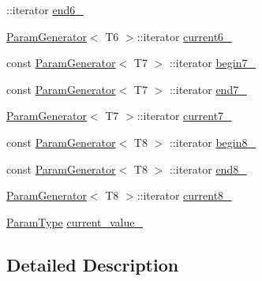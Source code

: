 \begin{DoxyCompactItemize}
\-::iterator \hyperlink{classtesting_1_1internal_1_1CartesianProductGenerator8_1_1Iterator_aa7a82d43bb33f76b3ae3a87435d3e97e}{end6\-\_\-}
\item 
\hyperlink{classtesting_1_1internal_1_1ParamGenerator}{\-Param\-Generator}$<$ \-T6 $>$\-::iterator \hyperlink{classtesting_1_1internal_1_1CartesianProductGenerator8_1_1Iterator_ab8337df5dbe6ea9aeac0a56c7ef816f9}{current6\-\_\-}
\item 
const \hyperlink{classtesting_1_1internal_1_1ParamGenerator}{\-Param\-Generator}$<$ \-T7 $>$\*
\-::iterator \hyperlink{classtesting_1_1internal_1_1CartesianProductGenerator8_1_1Iterator_a7b6566d85fbeda1c87fa7c5fe6d92214}{begin7\-\_\-}
\item 
const \hyperlink{classtesting_1_1internal_1_1ParamGenerator}{\-Param\-Generator}$<$ \-T7 $>$\*
\-::iterator \hyperlink{classtesting_1_1internal_1_1CartesianProductGenerator8_1_1Iterator_a858e56e6a8f3e6b6422ef51121b31dd5}{end7\-\_\-}
\item 
\hyperlink{classtesting_1_1internal_1_1ParamGenerator}{\-Param\-Generator}$<$ \-T7 $>$\-::iterator \hyperlink{classtesting_1_1internal_1_1CartesianProductGenerator8_1_1Iterator_a0504e607233e7862dc08914848bfbd98}{current7\-\_\-}
\item 
const \hyperlink{classtesting_1_1internal_1_1ParamGenerator}{\-Param\-Generator}$<$ \-T8 $>$\*
\-::iterator \hyperlink{classtesting_1_1internal_1_1CartesianProductGenerator8_1_1Iterator_a91a92a0fc0328c84d74c063ccb0a25b9}{begin8\-\_\-}
\item 
const \hyperlink{classtesting_1_1internal_1_1ParamGenerator}{\-Param\-Generator}$<$ \-T8 $>$\*
\-::iterator \hyperlink{classtesting_1_1internal_1_1CartesianProductGenerator8_1_1Iterator_ab417b7d08ca257d55b458fff41e7d2bb}{end8\-\_\-}
\item 
\hyperlink{classtesting_1_1internal_1_1ParamGenerator}{\-Param\-Generator}$<$ \-T8 $>$\-::iterator \hyperlink{classtesting_1_1internal_1_1CartesianProductGenerator8_1_1Iterator_a09c927e88c6edbaafd0f12fb37702c81}{current8\-\_\-}
\item 
\hyperlink{classtesting_1_1internal_1_1CartesianProductGenerator8_a1323810362151af79d39617fabdcade1}{\-Param\-Type} \hyperlink{classtesting_1_1internal_1_1CartesianProductGenerator8_1_1Iterator_a1b76a85d1482a16a96efc293e8384512}{current\-\_\-value\-\_\-}
\end{DoxyCompactItemize}


\subsection{\-Detailed \-Description}

